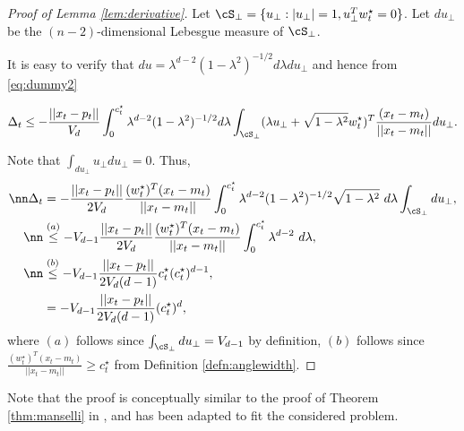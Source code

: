\begin{proof}[Proof of Lemma \ref{lem:derivative}]
Let $\cS_{\perp} = \{u_\perp: |u_\perp|=1 , u_\perp^T w_t^\star=0\}$. Let $du_{\perp}$ be the 
$(n-2)$-dimensional Lebesgue measure of $\cS_{\perp}$. 

It is easy to verify that 
$du = \lambda^{d-2}(1-\lambda^2)^{-1/2} d\lambda du_{\perp}$ and hence from \eqref{eq:dummy2}

\begin{equation}\label{eq:dummy3}
\Delta_t  \le -\frac{||x_t-p_t||}{V_d} \int_{0}^{c_t^\star}  \lambda^{d-2}(1-\lambda^2)^{-1/2} d\lambda \int_{\cS_{\perp}} (\lambda u_{\perp} + \sqrt{1-\lambda^2} w_t^\star)^T \frac{(x_t-m_t)}{||x_t-m_t||}  du_{\perp}.
\end{equation}
 
 Note that $\int_{du_{\perp}} u_{\perp} du_{\perp}=0$. Thus,
 \begin{align}\nn \label{}
\Delta_t  & = -\frac{||x_t-p_t||}{2V_d} \frac{(w_t^\star)^T(x_t-m_t)}{||x_t-m_t||}  \int_{0}^{c_t^\star}  \lambda^{d-2}(1-\lambda^2)^{-1/2}   \sqrt{1-\lambda^2}\ d\lambda   \int_{\cS_{\perp}} du_{\perp},\\ 
\nn
& \stackrel{(a)}\le -V_{d-1} \frac{||x_t-p_t||}{2V_d}  \frac{ (w_t^\star)^T(x_t-m_t)}{||x_t-m_t||}  \int_{0}^{c_t^\star} \lambda^{d-2}\ d\lambda, \\ \nn
& \stackrel{(b)}\le  -V_{d-1}\frac{||x_t-p_t||}{2V_d(d-1)} c_t^\star (c_t^\star)^{d-1},\\ 
& = -V_{d-1}\frac{||x_t-p_t||}{2V_d(d-1)}  (c_t^\star)^{d},
\end{align}
where $(a)$ follows since  $\int_{\cS_{\perp}} du_{\perp} = V_{d-1}$ by definition, $(b)$ follows since $ \frac{(w_t^\star)^T(x_t-m_t)}{||x_t-m_t||} \ge c_t^\star$ from Definition \ref{defn:anglewidth}.

 \end{proof}
 Note that the proof is conceptually similar to the proof of Theorem \ref{thm:manselli} in \cite{Manselli}, 
 and has been adapted to fit the considered problem.